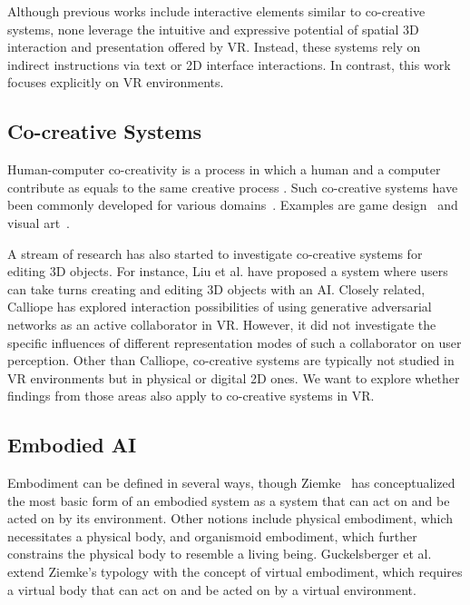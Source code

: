 Although previous works include interactive elements similar to co-creative systems, none leverage the intuitive and expressive potential of spatial 3D interaction and presentation offered by VR. Instead, these systems rely on indirect instructions via text or 2D interface interactions. In contrast, this work focuses explicitly on VR environments.

\subsection{Co-creative Systems}

Human-computer co-creativity is a process in which a human and a computer contribute as equals to the same creative process \cite{davis_human-computer_2013}. 
Such co-creative systems have been commonly developed for various domains~\cite{rezwana_designing_2022}. Examples are game design~\cite{liapis_sentient_2013,lucas_stay_2017} and visual art~\cite{davis_empirically_2016,oh_i_2018,lin_it_2020}. 
 


A stream of research has also started to investigate co-creative systems for editing 3D objects. For instance, Liu et al. \cite{liu_interactive_2018} have proposed a system where users can take turns creating and editing 3D objects with an AI.
Closely related, Calliope \cite{urban_davis_designing_2021} has explored interaction possibilities of using generative adversarial networks as an active collaborator in VR. However, it did not investigate the specific influences of different representation modes of such a collaborator on user perception.
Other than Calliope, co-creative systems are typically not studied in VR environments but in physical or digital 2D ones. We want to explore whether findings from those areas also apply to co-creative systems in VR.


\subsection{Embodied AI}
Embodiment can be defined in several ways, though Ziemke~\cite{ziemke_whats_2003} has conceptualized the most basic form of an embodied system as a system that can act on and be acted on by its environment. Other notions include physical embodiment, which necessitates a physical body, and organismoid embodiment, which further constrains the physical body to resemble a living being. Guckelsberger et al. \cite{guckelsberger_embodiment_2021} extend Ziemke's typology with the concept of virtual embodiment, which requires a virtual body that can act on and be acted on by a virtual environment.


